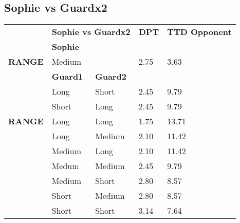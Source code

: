 \subsection{Sophie vs Guardx2}
\begin{table}[H]
  \centering
\begin{tabular}{ll|l|l|l|}
\cline{2-5}
\multicolumn{1}{l|}{} & \multicolumn{2}{c|}{\cellcolor[HTML]{C0C0C0}\textbf{Sophie vs Guardx2}} & \cellcolor[HTML]{C0C0C0}\textbf{DPT} & \cellcolor[HTML]{C0C0C0}\textbf{TTD Opponent} \\ \cline{2-5} 
\multicolumn{1}{l|}{\textbf{}} & \multicolumn{2}{l|}{\textbf{Sophie}} & \multicolumn{2}{l|}{} \\ \hline
\multicolumn{1}{|l|}{\cellcolor[HTML]{C0C0C0}\textbf{RANGE}} & \multicolumn{2}{l|}{Medium} & 2.75 & 3.63 \\ \hline
\multicolumn{1}{l|}{} & \textbf{Guard1} & \textbf{Guard2} & \multicolumn{2}{l|}{} \\ \hline
\multicolumn{1}{|l|}{\cellcolor[HTML]{C0C0C0}} & Long & Short & 2.45 & 9.79 \\ \cline{2-5} 
\multicolumn{1}{|l|}{\cellcolor[HTML]{C0C0C0}} & Short & Long & 2.45 & 9.79 \\ \cline{2-5} 
\multicolumn{1}{|l|}{\cellcolor[HTML]{C0C0C0} \textbf{RANGE}} & Long & Long & 1.75 & 13.71 \\ \cline{2-5} 
\multicolumn{1}{|l|}{\cellcolor[HTML]{C0C0C0}} & Long & Medium & 2.10 & 11.42 \\ \cline{2-5} 
\multicolumn{1}{|l|}{\cellcolor[HTML]{C0C0C0}} & Medium & Long & 2.10 & 11.42 \\ \cline{2-5}
\multicolumn{1}{|l|}{\cellcolor[HTML]{C0C0C0}} & Medum & Medium & 2.45 & 9.79 \\ \cline{2-5} 
\multicolumn{1}{|l|}{\cellcolor[HTML]{C0C0C0}} & Medium & Short & 2.80 & 8.57 \\ \cline{2-5} 
\multicolumn{1}{|l|}{\cellcolor[HTML]{C0C0C0}} & Short & Medium & 2.80 & 8.57 \\ \cline{2-5} 
\multicolumn{1}{|l|}{\cellcolor[HTML]{C0C0C0}} & Short & Short & 3.14 & 7.64 \\ \hline 
\end{tabular}
\end{table}


